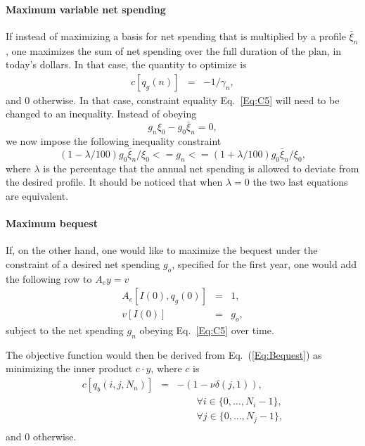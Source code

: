 \documentclass{report}[fleqn,11pt]
\begin{document}
\paragraph*{Maximum variable net spending}
If instead of maximizing a basis for net spending that is multiplied by a profile $\bar{\xi}_n$,
one maximizes the sum of net spending over the full duration
of the plan, in today's dollars. In that case, the quantity to optimize is
\begin{eqnarray}
	c[q_g(n)] &=& -1/\gamma_n,
\end{eqnarray}
and 0 otherwise.
In that case, constraint equality Eq.~\ref{Eq:C5} will need to be changed to an inequality. 
Instead of obeying 
\begin{equation}
	g_n \xi_0 - g_0 \bar{\xi}_n = 0,
\end{equation}
we now impose the following inequality constraint
\begin{equation}
        \label{Eq:C15}
	(1 - \lambda/100) g_0 \bar{\xi}_n/\xi_0 <= g_n <= (1 + \lambda/100) g_0 \bar{\xi}_n/\xi_0 ,
\end{equation}
where $\lambda$ is the percentage that the annual net spending is allowed to deviate
from the desired profile. It should be noticed that when $\lambda = 0$ the two
last equations are equivalent.

\paragraph*{Maximum bequest}
If, on the other hand, one would like to maximize the bequest under the constraint of a desired
net spending $g_o$, specified for the first year,
one would add the following row to $A_ey = v$
\begin{eqnarray}
	\label{Eq:FixedIncome}
	A_e[I(0), q_g(0)] &=& 1, \nonumber \\
	v[I(0)] &=& g_o,
\end{eqnarray}
subject to the net spending $g_n$ obeying Eq.~\ref{Eq:C5} over time.

The objective function would then be derived from Eq.~(\ref{Eq:Bequest}) as
minimizing the inner product $c\cdot y$, where $c$ is
\begin{eqnarray}
	\label{Eq:MaxBequest}
	c[q_b(i, j, N_n)] &=& -(1 - \nu\delta(j, 1)),\\
	&&\qquad\forall i \in \{0,\ldots, N_i-1\},\nonumber\\
	&&\qquad\forall j \in \{0,\ldots, N_j-1\},\nonumber\\
\end{eqnarray}
and 0 otherwise.
\end{document}

